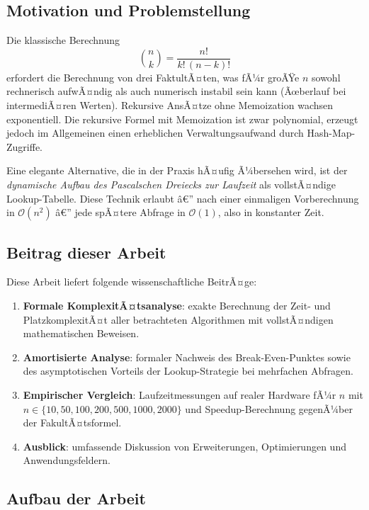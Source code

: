 ﻿\documentclass[12pt, a4paper]{article}
\newcommand{\Oh}{\mathcal{O}}
\theoremstyle{plain}
\theoremstyle{definition}
\theoremstyle{remark}
\renewcommand{\Oh}{\mathcal{O}}
\begin{document}
\subsection{Motivation und Problemstellung}

Die klassische Berechnung
\begin{equation}
  \binom{n}{k} = \frac{n!}{k!\,(n-k)!}
  \label{eq:klassisch}
\end{equation}
erfordert die Berechnung von drei FaktultÃ¤ten, was fÃ¼r groÃŸe $n$
sowohl rechnerisch aufwÃ¤ndig als auch numerisch instabil sein kann
(Ãœberlauf bei intermediÃ¤ren Werten). Rekursive AnsÃ¤tze ohne
Memoization wachsen exponentiell. Die rekursive Formel mit Memoization
ist zwar polynomial, erzeugt jedoch im Allgemeinen einen erheblichen
Verwaltungsaufwand durch Hash-Map-Zugriffe.

Eine elegante Alternative, die in der Praxis hÃ¤ufig Ã¼bersehen wird,
ist der \emph{dynamische Aufbau des Pascalschen Dreiecks zur Laufzeit}
als vollstÃ¤ndige Lookup-Tabelle. Diese Technik erlaubt â€” nach einer
einmaligen Vorberechnung in $\Oh(n^2)$ â€” jede spÃ¤tere Abfrage in
$\Oh(1)$, also in konstanter Zeit.

\subsection{Beitrag dieser Arbeit}

Diese Arbeit liefert folgende wissenschaftliche BeitrÃ¤ge:
\begin{enumerate}[label=(\roman*)]
  \item \textbf{Formale KomplexitÃ¤tsanalyse}: exakte Berechnung der
        Zeit- und PlatzkomplexitÃ¤t aller betrachteten Algorithmen mit
        vollstÃ¤ndigen mathematischen Beweisen.
  \item \textbf{Amortisierte Analyse}: formaler Nachweis des
        Break-Even-Punktes sowie des asymptotischen Vorteils der
        Lookup-Strategie bei mehrfachen Abfragen.
  \item \textbf{Empirischer Vergleich}: Laufzeitmessungen auf realer
        Hardware fÃ¼r $n$ mit $n \in \{10, 50, 100, 200, 500, 1000, 2000\}$ und
        Speedup-Berechnung gegenÃ¼ber der FakultÃ¤tsformel.
  \item \textbf{Ausblick}: umfassende Diskussion von Erweiterungen,
        Optimierungen und Anwendungsfeldern.
\end{enumerate}

\subsection{Aufbau der Arbeit}
\end{document}
